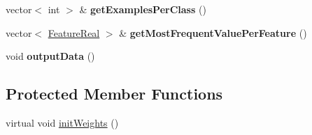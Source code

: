 \begin{DoxyCompactItemize}
\item 
\hypertarget{classMultiBoost_1_1RawData_a4a610440d2efafbf90988ca2ba9f421a}{vector$<$ int $>$ \& {\bfseries get\-Examples\-Per\-Class} ()}\label{classMultiBoost_1_1RawData_a4a610440d2efafbf90988ca2ba9f421a}

\item 
\hypertarget{classMultiBoost_1_1RawData_a5852e22937103a032dbcc6bc17faf96e}{vector$<$ \hyperlink{Defaults_8h_a3a11cfe6a5d469d921716ca6291e934f}{Feature\-Real} $>$ \& {\bfseries get\-Most\-Frequent\-Value\-Per\-Feature} ()}\label{classMultiBoost_1_1RawData_a5852e22937103a032dbcc6bc17faf96e}

\item 
\hypertarget{classMultiBoost_1_1RawData_addc0c665d4f39e5f2a8e892f84187969}{void {\bfseries output\-Data} ()}\label{classMultiBoost_1_1RawData_addc0c665d4f39e5f2a8e892f84187969}

\end{DoxyCompactItemize}
\subsection*{Protected Member Functions}
\begin{DoxyCompactItemize}
\item 
virtual void \hyperlink{classMultiBoost_1_1RawData_a5ad8fc0885ac054846ee38040c765563}{init\-Weights} ()
\end{DoxyCompactItemize}
